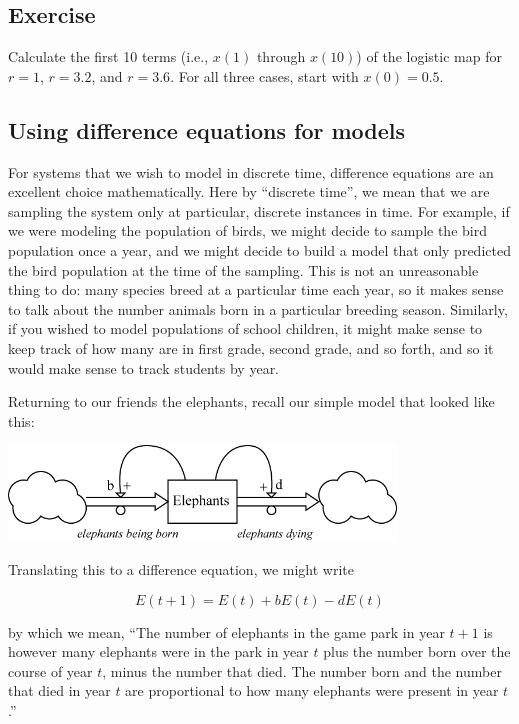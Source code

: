 \subsection{Exercise}

Calculate the first 10 terms (i.e., $x(1)$ through $x(10)$) of the logistic map for $r=1$, $r=3.2$, and $r=3.6$.  For all three cases, start with $x(0) = 0.5$.

 

\subsection{Using difference equations for models}

For systems that we wish to model in discrete time, difference equations are an excellent choice mathematically.  Here by ``discrete time'', we mean that we are sampling the system only at particular, discrete instances in time.  For example, if we were modeling the population of birds, we might decide to sample the bird population once a year, and we might decide to build a model that only predicted the bird population at the time of the sampling.  This is not an unreasonable thing to do:  many species breed at a particular time each year, so it makes sense to talk about the number animals born in a particular breeding season.  Similarly, if you wished to model populations of school children, it might make sense to keep track of how many are in first grade, second grade, and so forth, and  so it would make sense to track students by year.  

Returning to our friends the elephants, recall our simple model that looked like this:

\beforefig
 \centerline{\includegraphics[height=1in]{figs/ElephantStockAndFlow1}}
\afterfig

Translating this to a difference equation, we might write

$$E(t+1) = E(t) + b E(t) - d E(t)$$

by which we mean, ``The number of elephants in the game park in year $t+1$ is however many elephants were in the park in year $t$ plus the number born over the course of year $t$, minus the number that died.  The number born  and the number that died in year $t$ are proportional to how many elephants were present in year $t$.''


